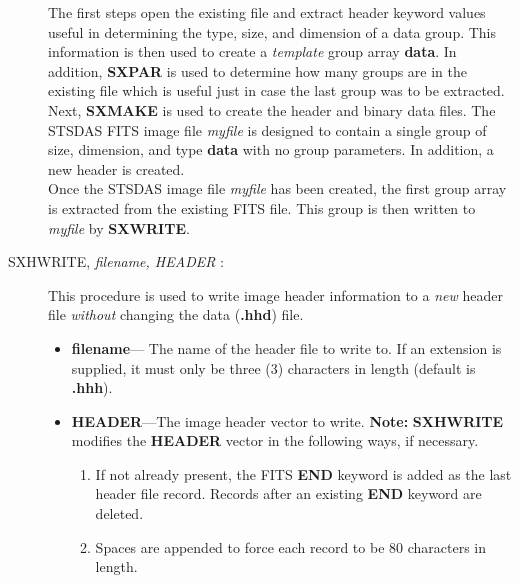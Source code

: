 \begin{description}
The first steps open the existing file and extract header keyword values
useful in determining the type, size, and dimension of a data group.  This 
information is then used to create a {\it template} group array {\bf data}.
In addition, {\bf SXPAR} is used to determine how many groups are in the
existing file which is useful just in case the last group was to be extracted.\\

Next, {\bf SXMAKE} is used to create the header and binary data files.
The STSDAS FITS image file {\it myfile} is designed to contain a single group
of size, dimension, and type {\bf data} with no group parameters.  In
addition, a new header is created.\\

Once the STSDAS image file {\it myfile} has been created, the first group array
is extracted from the existing FITS file.  This group is then written to 
{\it myfile} by {\bf SXWRITE}.

\item [SXHWRITE, {\it filename, HEADER} :]

This procedure is used to write image header information to a {\it new} 
header file {\it without} changing the data ({\bf .hhd}) file.

\begin{itemize}

\item {\bf filename}--- The name of the header file to write to.  
If an extension is supplied, it must only be three (3) characters in 
length (default is {\bf .hhh}).

\item {\bf HEADER}---The image header vector to write. {\bf Note:} {\bf SXHWRITE} 
modifies the {\bf HEADER} vector in the following ways, if necessary.

\begin{enumerate}

\item If not already present, the FITS {\bf END} keyword is added as the last 
header file record.   Records after an existing {\bf END} keyword are deleted.

\item Spaces are appended to force each record to be 80 characters in length.

\end{enumerate}
\end{itemize}
\newpage


\end{description}
